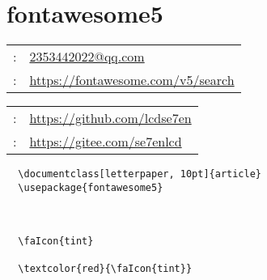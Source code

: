 

\section{fontawesome5 \textcolor{green}{} \textcolor{blue}{}  \textcolor{cyan}{} }

\begin{minipage}[t]{.5\linewidth}
\begin{tabular}{rp{.75\linewidth}}
	\baselineskip=20pt
	\email{} :     & \href{2353442022@qq.com}{2353442022@qq.com}\\
	\www{} : &\href{https://fontawesome.com/v5/search}{https://fontawesome.com/v5/search}
\end{tabular}
\end{minipage}
\begin{minipage}[t]{.5\linewidth}
\begin{tabular}{rl}
	\gh{} : & \href{https://github.com/lcdse7en}{https://github.com/lcdse7en}\\
	\gitee{} : &\href{https://gitee.com/se7enlcd}{https://gitee.com/se7enlcd}
\end{tabular}
\end{minipage}

\begin{verbatim}
  \documentclass[letterpaper, 10pt]{article}
  \usepackage{fontawesome5}

  

  \faIcon{tint}

  \textcolor{red}{\faIcon{tint}}

  

\end{verbatim}


